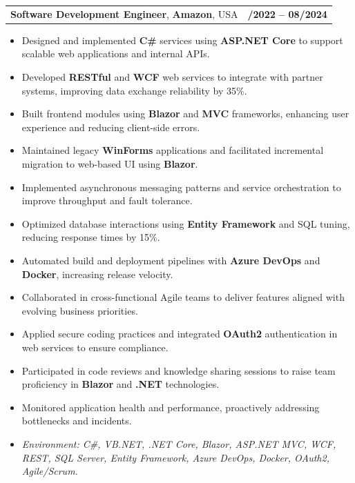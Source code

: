\documentclass[letterpaper,11pt]{article}
\makeatletter
\newcommand{\resumeItem}[1]{
  \item\footnotesize{
    {#1 \vspace{-2pt}}
  }
}
\newcommand{\resumeSubheading}[4]{
  \vspace{-2pt}\item
    \begin{tabular*}{1.0\textwidth}[t]{l@{\extracolsep{\fill}}r}
      \textbf{\fontsize{10pt}{14pt}\selectfont #3}, \textbf{\fontsize{10pt}{14pt}\selectfont #1}, \fontsize{10pt}{14pt}\selectfont #4 & \textbf{\fontsize{10pt}{14pt}\selectfont #2} \\
    \end{tabular*}\vspace{-7pt}
}
\newcommand{\resumeItemListStart}{\begin{itemize}[leftmargin=*]}
\newcommand{\resumeItemListEnd}{\end{itemize}\vspace{-5pt}}
\makeatother
\begin{document}
\resumeSubheading
{Amazon}{10/2022 -- 08/2024}
{Software Development Engineer}{USA}
\resumeItemListStart
  \resumeItem{Designed and implemented \textbf{C\#} services using \textbf{ASP.NET Core} to support scalable web applications and internal APIs.}
  \resumeItem{Developed \textbf{RESTful} and \textbf{WCF} web services to integrate with partner systems, improving data exchange reliability by 35\%.}
  \resumeItem{Built frontend modules using \textbf{Blazor} and \textbf{MVC} frameworks, enhancing user experience and reducing client-side errors.}
  \resumeItem{Maintained legacy \textbf{WinForms} applications and facilitated incremental migration to web-based UI using \textbf{Blazor}.}
  \resumeItem{Implemented asynchronous messaging patterns and service orchestration to improve throughput and fault tolerance.}
  \resumeItem{Optimized database interactions using \textbf{Entity Framework} and SQL tuning, reducing response times by 15\%.}
  \resumeItem{Automated build and deployment pipelines with \textbf{Azure DevOps} and \textbf{Docker}, increasing release velocity.}
  \resumeItem{Collaborated in cross-functional Agile teams to deliver features aligned with evolving business priorities.}
  \resumeItem{Applied secure coding practices and integrated \textbf{OAuth2} authentication in web services to ensure compliance.}
  \resumeItem{Participated in code reviews and knowledge sharing sessions to raise team proficiency in \textbf{Blazor} and \textbf{.NET} technologies.}
  \resumeItem{Monitored application health and performance, proactively addressing bottlenecks and incidents.}
  \resumeItem{\textit{Environment: C\#, VB.NET, .NET Core, Blazor, ASP.NET MVC, WCF, REST, SQL Server, Entity Framework, Azure DevOps, Docker, OAuth2, Agile/Scrum.}}
\resumeItemListEnd
\end{document}
